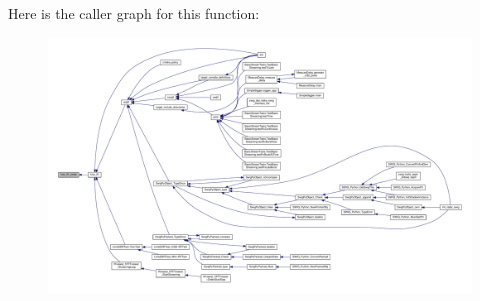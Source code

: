 Here is the caller graph for this function\+:
\nopagebreak
\begin{figure}[H]
\begin{center}
\leavevmode
\includegraphics[width=350pt]{d0/dc9/kiss__fft_8h_a240e0a77bb991890d609f498f9c75ec8_icgraph}
\end{center}
\end{figure}


